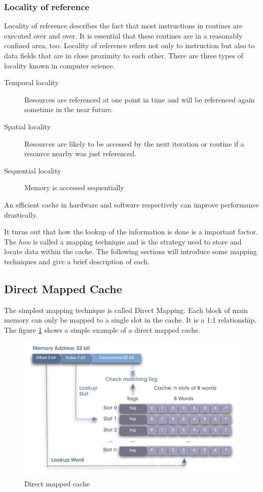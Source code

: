 \documentclass[DIV10, abstracton, openright, footsepline, headsepline, twoside, 9pt,
bigheadings]{scrreprt}
\begin{document}
\subsubsection{Locality of reference}
Locality of reference describes the fact that most instructions in routines are
executed over and over. It is essential that these routines are in a reasonably
confined area, too. Locality of reference refers not only to instruction but
also to data fields that are in close proximity to each other. There are three
types of locality known in computer science.
\begin{description}
\item[Temporal locality] Resources are referenced at one point in time
and will be referenced again sometime in the near future.
\item[Spatial locality] Resources are likely to be accessed by the next
iteration or routine if a resource nearby was just referenced.
\item[Sequential locality] Memory is accessed sequentially\\
\end{description}
An efficient cache in hardware and software respectively can improve
performance drastically.

It turns out that how the lookup of the information is done is a
important factor. The \textit{how} is called a mapping technique and is the
strategy used to store and locate data within the cache. The following sections
will introduce some mapping techniques and give a brief description of each.

\subsection{Direct Mapped Cache}
The simplest mapping technique is called Direct Mapping. Each block of main
memory can only be mapped to a single slot in the cache. It is a 1:1
relationship. The figure \ref{fig:dm_cache} shows a simple example of a direct
mapped cache.

\begin{figure}[H]
\centering
\includegraphics[width=\textwidth]{diagramme/dm_cache}
\caption{Direct mapped cache}
\label{fig:dm_cache}
\end{figure}
\end{document}
